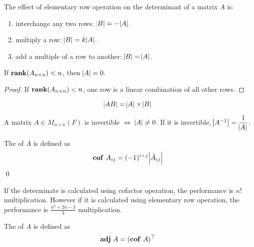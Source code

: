 \begin{theorem}
    The effect of elementary row operation on the determinant of a matrix $A$ is:
\begin{enumerate}
    \item interchange any two rows: $\abs{B} = - \abs{A}$.
    \item multiply a row: $\abs{B} = k \abs{A}$.
    \item add a multiple of a row to another: $\abs{B} = \abs{A}$.
\end{enumerate}
\end{theorem}


\begin{theorem}
    If $\displaystyle \mathbf{rank}( A_{n \times n} ) < n$, then $\abs{A} = 0$.
\end{theorem}
\begin{proof}
    If $\displaystyle \mathbf{rank}( A_{n \times n} ) < n$, one row is a linear combination of all other rows.
\end{proof}



\begin{theorem}
	\begin{equation}
		\abs{AB} = \abs{A} \times \abs{B}
	\end{equation}
\end{theorem}

\begin{theorem}
	A matrix $A \in M_{n \times n}(F)$ is invertible $\Leftrightarrow$ $\abs{A} \neq 0$. If it is invertible, $\abs{A^{-1}} = \dfrac{1}{\abs{A}}$.
\end{theorem}

\begin{definition}
    The  of $A$ is defined as 
    \begin{equation}
        \displaystyle \mathbf{cof} ~\displaystyle A_{ij} = (-1)^{i+j} \abs{\tilde{A}_{ij}}
    \end{equation}\qed
\end{definition}


If the determinate is calculated using cofactor operation, the performance is $n!$ multiplication. However if it is calculated using elementary row operation, the performance is $\displaystyle \frac{n^3 + 2n - 3}{3}$ multiplication.

\begin{definition}
    The  of $A$ is defined as
    \begin{equation}
        \displaystyle \mathbf{adj} ~\displaystyle A = (\displaystyle \mathbf{cof} ~\displaystyle A)^\top
    \end{equation}
\end{definition}

